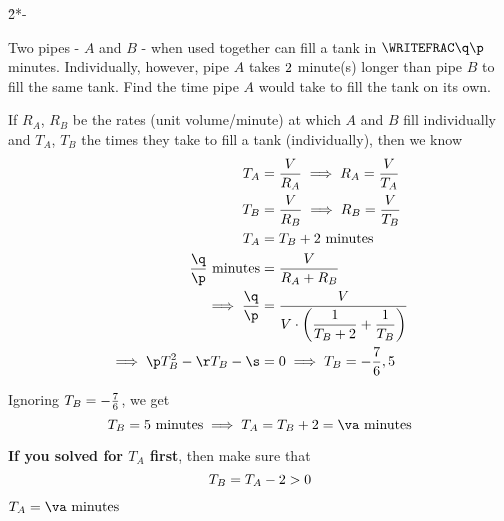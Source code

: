 

\ADD\vb\vd\va
{}\vb\p\q
\EXPR[0]\r{2*\q-\vd*\p}
\MULTIPLY\vd\q\s

\question[4] Two pipes - $A$ and $B$ - when used together can fill a tank in $\WRITEFRAC\q\p$ minutes.
Individually, however, pipe $A$ takes $2$ minute(s) longer than pipe $B$ to fill the same
tank. Find the time pipe $A$ would take to fill the tank on its own. 

\watchout


\begin{solution}[\fullpage]
	If $R_A$, $R_B$ be the rates (unit volume/minute) at which $A$ and $B$ fill individually
	and $T_A$, $T_B$ the times they take to fill a tank (individually), then we know
	\begin{align}
		T_A &= \dfrac{V}{R_A} \implies R_A = \dfrac{V}{T_A}\\
		T_B &= \dfrac{V}{R_B} \implies R_B = \dfrac{V}{T_B}\\
		T_A &= T_B + \vd\text{ minutes} \\
		\dfrac\q\p\text{ minutes} &= \dfrac{V}{R_A + R_B} \\
		\implies\dfrac\q\p &= \dfrac{V}{V\cdot\left(\dfrac{1}{T_B + \vd} + \dfrac{1}{T_B}\right)} \\
		\implies \p T_B^2 - \r T_B - \s &= 0\implies T_B = \vx,\vb
	\end{align}
	
	Ignoring $T_B = -\frac{7}{6}$, we get 
  \[ T_B = \vb\text{ minutes} \implies T_A = T_B + \vd = \va\text{ minutes} \]

  \textbf{If you solved for $T_A$ first}, then make sure that 
  \[T_B = T_A-2 > 0\]
\end{solution}

\ifprintanswers\begin{codex}$T_A=\va\text{ minutes}$\end{codex}\fi
